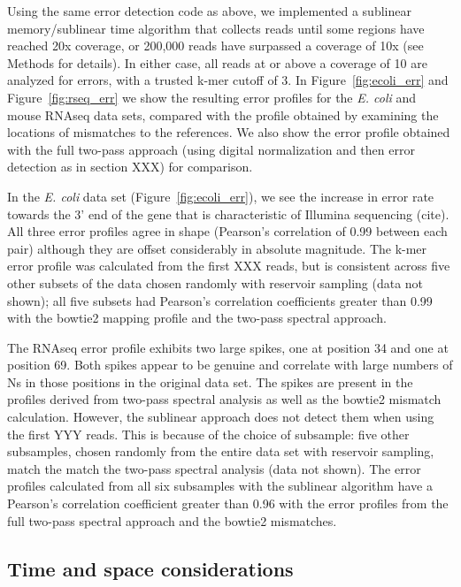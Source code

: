 \documentclass{article}
\begin{document}
Using the same error detection code as above, we implemented a
sublinear memory/sublinear time algorithm that collects reads until
some regions have reached 20x coverage, or 200,000 reads have
surpassed a coverage of 10x (see Methods for details).  In either
case, all reads at or above a coverage of 10 are analyzed for errors,
with a trusted k-mer cutoff of 3.  In Figure~\ref{fig:ecoli_err} and
Figure~\ref{fig:rseq_err} we show the resulting error profiles for the
{\em E. coli} and mouse RNAseq data sets, compared with the profile
obtained by examining the locations of mismatches to the references.
We also show the error profile obtained with the full two-pass approach
(using digital normalization and then error detection as in section XXX)
for comparison.

In the {\em E. coli} data set (Figure~\ref{fig:ecoli_err}), we see the
increase in error rate towards the 3' end of the gene that is
characteristic of Illumina sequencing (cite).  All three error
profiles agree in shape (Pearson's correlation of 0.99 between each
pair) although they are offset considerably in absolute magnitude.
The k-mer error profile was calculated from the first XXX reads, but
is consistent across five other subsets of the data chosen randomly
with reservoir sampling (data not shown); all five subsets had
Pearson's correlation coefficients greater than 0.99 with the
bowtie2 mapping profile and the two-pass spectral approach.

The RNAseq error profile exhibits two large spikes, one at position 34
and one at position 69.  Both spikes appear to be genuine and
correlate with large numbers of Ns in those positions in the original
data set.  The spikes are present in the profiles derived from
two-pass spectral analysis as well as the bowtie2 mismatch
calculation.  However, the sublinear approach does not detect them
when using the first YYY reads.  This is because of the choice of
subsample: five other subsamples, chosen randomly from the entire data
set with reservoir sampling, match the match the two-pass spectral
analysis (data not shown).  The error profiles calculated from all six
subsamples with the sublinear algorithm have a Pearson's correlation
coefficient greater than 0.96 with the error profiles from the full
two-pass spectral approach and the bowtie2 mismatches.


\subsection{Time and space considerations}
\end{document}
